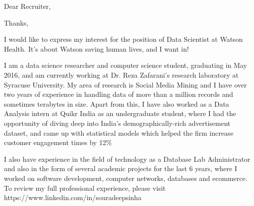 \documentclass[11pt,letterpaper,sans]{moderncv}        %
\begin{document}
\nocite{*}


\clearpage
\fi
\fi
\date{January 21, 2016}
\opening{Dear Recruiter,}
\closing{Thanks,}
\makelettertitle

I would like to express my interest for the position of Data Scientist at Watson Health. It's about Watson saving human lives, and I want in!

I am a data science researcher and computer science student, graduating in May 2016, and am currently working at Dr. Reza Zafarani's research laboratory at Syracuse University. My area of research is Social Media Mining and I have over two years of experience in handling data of more than a million records and sometimes terabytes in size. Apart from this, I have also worked as a Data Analysis intern at Quikr India as an undergraduate student, where I had the opportunity of diving deep into India's demographically-rich advertisement dataset, and came up with statistical models which helped the firm increase customer engagement times by 12\%

I also have experience in the field of technology as a Database Lab Administrator and also in the form of several academic projects for the last 6 years, where I worked on software development, computer networks, databases and ecommerce. To review my full professional experience, please visit https://www.linkedin.com/in/souradeepsinha 
\end{document}
